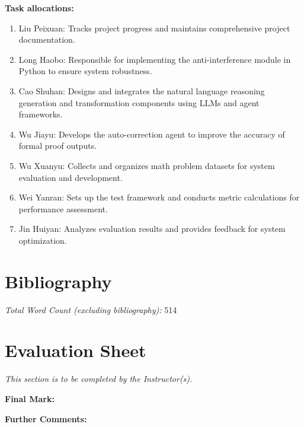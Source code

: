 \documentclass[a4paper,11pt]{article}
\begin{document}
\textbf{Task allocations:} 
\begin{enumerate}
    \item Liu Peixuan: Tracks project progress and maintains comprehensive project documentation.
    \item Long Haobo: Responsible for implementing the anti-interference module in Python to ensure system robustness.
    \item Cao Shuhan: Designs and integrates the natural language reasoning generation and transformation components using LLMs and agent frameworks.
    \item Wu Jiayu: Develops the auto-correction agent to improve the accuracy of formal proof outputs.
    \item Wu Xuanyu: Collects and organizes math problem datasets for system evaluation and development.
    \item Wei Yanran: Sets up the test framework and conducts metric calculations for performance assessment.
    \item Jin Huiyan: Analyzes evaluation results and provides feedback for system optimization.
\end{enumerate}

\section*{Bibliography}




\vspace{2em}

\noindent\emph{Total Word Count (excluding bibliography):}
514
\newpage
\section*{Evaluation Sheet}

\noindent
\textit{This section is to be completed by the Instructor(s). }

\vspace{2em}
\noindent
\textbf{Final Mark:} \vspace{2em}

\noindent
\textbf{Further Comments:}
\vspace{6em}
\end{document}
